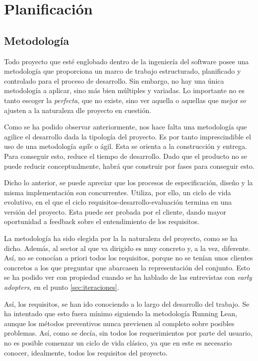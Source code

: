 
\chapter{Planificación}\label{planificacion}
\section{Metodología}\label{sec:metodologia_scrum}

Todo proyecto que esté englobado dentro de la ingeniería del software posee una metodología que proporciona un marco de trabajo estructurado, planificado y controlado para el proceso de desarrollo. Sin embargo, no hay una única metodología a aplicar, sino más bien múltiples y variadas. Lo importante no es tanto escoger la \textit{perfecta}, que no existe, sino ver aquella o aquellas que mejor se ajusten a la naturaleza dle proyecto en cuestión. 

Como se ha podido observar anteriormente, nos hace falta una metodología que agilice el desarrollo dada la tipología del proyecto. Es por tanto imprescindible el uso de una metodología \textit{agile} o ágil. Esta se orienta a la construcción y entrega. Para conseguir esto, reduce el tiempo de desarrollo. Dado que el producto no se puede reducir conceptualmente, habrá que construir por fases para conseguir esto.

Dicho lo anterior, se puede apreciar que los procesos de especificación, diseño y la misma implementación son concurrentes. Utiliza, por ello, un ciclo de vida evolutivo, en el que el ciclo requisitos-desarrollo-evaluación termina en una versión del proyecto. Esta puede ser probada por el cliente, dando mayor oportunidad a feedback sobre el entendimiento de los requisitos.

La metodología ha sido elegida por la la naturaleza del proyecto, como se ha dicho. Además, al sector al que va dirigido es muy concreto y, a la vez, diferente. Así, no se conocían a priori todos los requisitos, porque no se tenían unos clientes concretos a los que preguntar que abarcasen la representación del conjunto. Esto se ha podido ver con propiedad cuando se ha hablado de las entrevistas con \textit{early adopters}, en el punto \ref{sec:iteraciones}.

Así, los requisitos, se han ido conociendo a lo largo del desarrollo del trabajo. Se ha intentado que esto fuera mínimo siguiendo la metodología Running Lean, aunque los métodos preventivos nunca previenen al completo sobre posibles problemas. Así, como se decía, sin todos los requerimientos por parte del usuario, no es posible comenzar un ciclo de vida clásico, ya que en este es necesario conocer, idealmente, todos los requisitos del proyecto.

